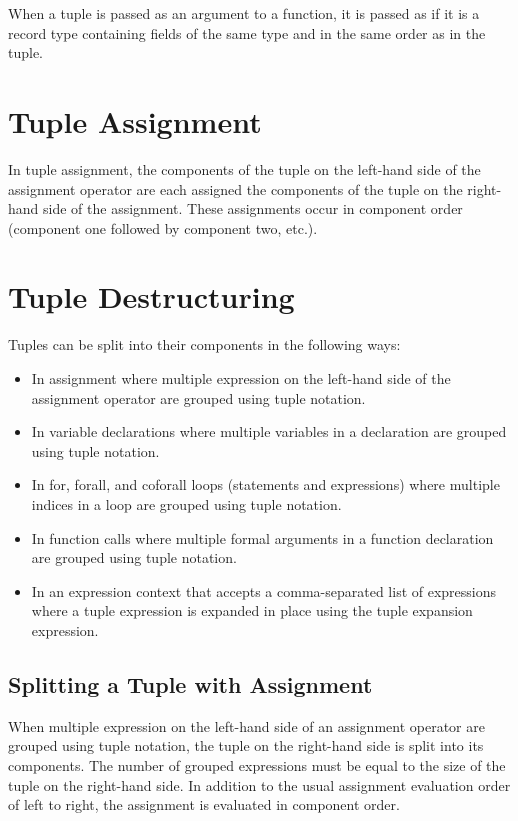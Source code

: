 When a tuple is passed as an argument to a function, it is passed as
if it is a record type containing fields of the same type and in
the same order as in the tuple.

\section{Tuple Assignment}
\label{Tuple_Assignment}

In tuple assignment, the components of the tuple on the left-hand side
of the assignment operator are each assigned the components of the
tuple on the right-hand side of the assignment.  These assignments
occur in component order (component one followed by component two,
etc.).

\section{Tuple Destructuring}
\label{Tuple_Destructuring}

Tuples can be split into their components in the following ways:
\begin{itemize}
\item In assignment where multiple expression on the left-hand side of
the assignment operator are grouped using tuple notation.
\item In variable declarations where multiple variables in a
declaration are grouped using tuple notation.
\item In for, forall, and coforall loops (statements and expressions)
where multiple indices in a loop are grouped using tuple notation.
\item In function calls where multiple formal arguments in a function
declaration are grouped using tuple notation.
\item In an expression context that accepts a comma-separated list of
expressions where a tuple expression is expanded in place using the
tuple expansion expression.
\end{itemize}

\subsection{Splitting a Tuple with Assignment}

When multiple expression on the left-hand side of an assignment
operator are grouped using tuple notation, the tuple on the right-hand
side is split into its components.  The number of grouped expressions
must be equal to the size of the tuple on the right-hand side.  In
addition to the usual assignment evaluation order of left to right,
the assignment is evaluated in component order.

